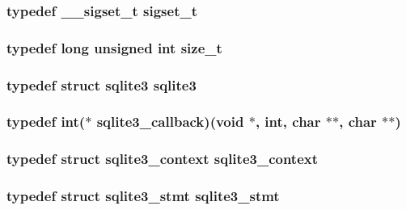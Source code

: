 \subsubsection[{sigset\_\-t}]{\setlength{\rightskip}{0pt plus 5cm}typedef {\bf \_\-\_\-sigset\_\-t} {\bf sigset\_\-t}}\label{tp_8c_a134f0411d52ec19a05b55b4ba2f87c3c}
\subsubsection[{size\_\-t}]{\setlength{\rightskip}{0pt plus 5cm}typedef long unsigned int {\bf size\_\-t}}\label{tp_8c_a222d67ef9d7959e65735150c95b7eee3}
\subsubsection[{sqlite3}]{\setlength{\rightskip}{0pt plus 5cm}typedef struct {\bf sqlite3} {\bf sqlite3}}\label{tp_8c_a0ef6f2646262c8a9b24368d8ac140f69}
\subsubsection[{sqlite3\_\-callback}]{\setlength{\rightskip}{0pt plus 5cm}typedef int($\ast$ {\bf sqlite3\_\-callback})(void $\ast$, int, char $\ast$$\ast$, char $\ast$$\ast$)}\label{tp_8c_adb558f903738a162410af19b774410fe}
\subsubsection[{sqlite3\_\-context}]{\setlength{\rightskip}{0pt plus 5cm}typedef struct {\bf sqlite3\_\-context} {\bf sqlite3\_\-context}}\label{tp_8c_a3b519553ffec8fc42b2356f5b1ebdc57}
\subsubsection[{sqlite3\_\-stmt}]{\setlength{\rightskip}{0pt plus 5cm}typedef struct {\bf sqlite3\_\-stmt} {\bf sqlite3\_\-stmt}}\label{tp_8c_af2a033da1327cdd77f0a174a09aedd0c}
